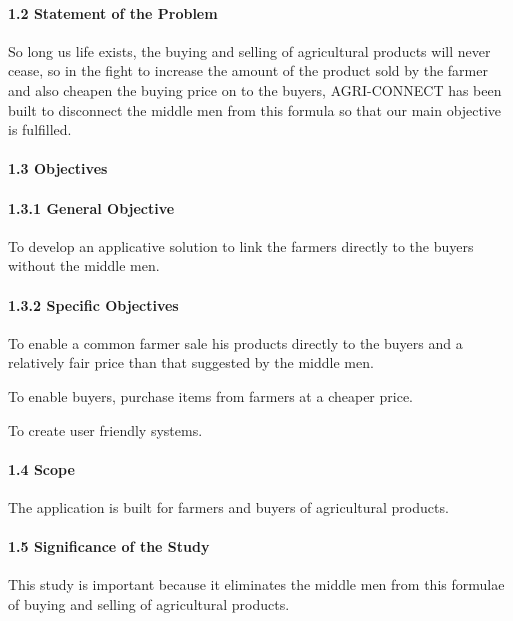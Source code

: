 \documentclass[10pt,a4paper]{report}
\begin{document}
\paragraph{1.2  Statement of the Problem}
\begin{flushleft}
So long us life exists, the buying and selling of agricultural products will never cease, so in the fight to increase the amount of the product sold by the farmer and also cheapen the buying price on to the buyers, AGRI-CONNECT has been built to disconnect the middle men from this formula so that our main objective is fulfilled.
\end{flushleft}



\paragraph{1.3	Objectives}
\paragraph{1.3.1  General Objective}
\begin{flushleft}
To develop an applicative solution to link the farmers directly to the buyers without the middle men.
\end{flushleft}

\paragraph{1.3.2  Specific Objectives}
\begin{flushleft}
To enable a common farmer sale his products directly to the buyers and a relatively fair price than that suggested by the middle men.
\end{flushleft}

\begin{flushleft}
To enable buyers, purchase items from farmers at a cheaper price.
\end{flushleft}

\begin{flushleft}
To create user friendly systems.
\end{flushleft}

\paragraph{1.4  Scope}
\begin{flushleft}
The application is built for farmers and buyers of agricultural products.
\end{flushleft}

\paragraph{1.5  Significance of the Study}
\begin{flushleft}
This study is important because it eliminates the middle men from this formulae of buying and selling of agricultural products.
\end{flushleft}
\end{document}
